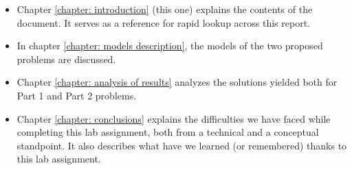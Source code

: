 \begin{itemize}
	\item Chapter \ref{chapter: introduction} (this one) explains the contents of the document. It serves as a reference for rapid lookup across this report.
    
	\item In chapter \ref{chapter: models description}, the models of the two proposed problems are discussed.
    
	\item Chapter \ref{chapter: analysis of results} analyzes the solutions yielded both for Part 1 and Part 2 problems. 

	\item Chapter \ref{chapter: conclusions} explains the difficulties we have faced while completing this lab assignment, both from a technical and a conceptual standpoint. It also describes what have we learned (or remembered) thanks to this lab assignment.
	
\end{itemize}
